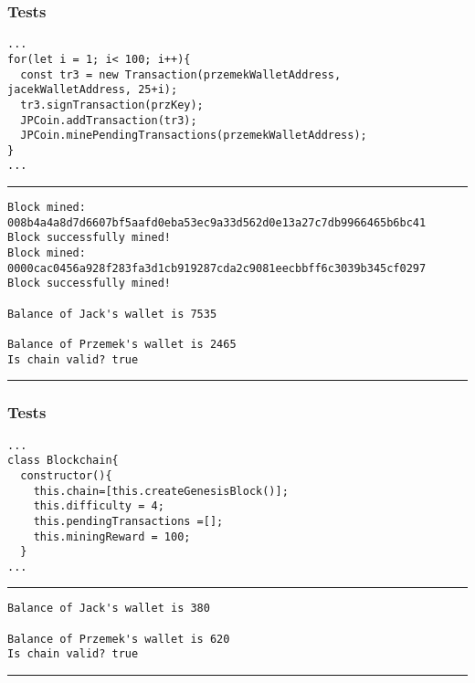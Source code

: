 \documentclass[14pt, aspectratio=169]{beamer}
\begin{document}
\begin{frame}[fragile]
\frametitle{Tests}
\scriptsize
\begin{verbatim}
...
for(let i = 1; i< 100; i++){
  const tr3 = new Transaction(przemekWalletAddress, jacekWalletAddress, 25+i);
  tr3.signTransaction(przKey);
  JPCoin.addTransaction(tr3);
  JPCoin.minePendingTransactions(przemekWalletAddress);
}
...
\end{verbatim}
\scriptsize
\rule{\textwidth}{1pt}
\begin{verbatim}
Block mined: 008b4a4a8d7d6607bf5aafd0eba53ec9a33d562d0e13a27c7db9966465b6bc41
Block successfully mined!
Block mined: 0000cac0456a928f283fa3d1cb919287cda2c9081eecbbff6c3039b345cf0297
Block successfully mined!

Balance of Jack's wallet is 7535

Balance of Przemek's wallet is 2465
Is chain valid? true
\end{verbatim}
\rule{\textwidth}{1pt}
\end{frame}

\begin{frame}[fragile]
\frametitle{Tests}
\scriptsize
\begin{verbatim}
...
class Blockchain{
  constructor(){
    this.chain=[this.createGenesisBlock()];
    this.difficulty = 4;
    this.pendingTransactions =[];
    this.miningReward = 100;
  }
...
\end{verbatim}
\scriptsize
\rule{\textwidth}{1pt}
\begin{verbatim}
Balance of Jack's wallet is 380

Balance of Przemek's wallet is 620
Is chain valid? true
\end{verbatim}
\rule{\textwidth}{1pt}
\end{frame}
\end{document}
